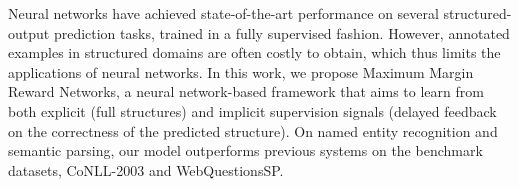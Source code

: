 Neural networks have achieved state-of-the-art performance on several structured-output prediction tasks, trained in a fully supervised fashion.  However, annotated examples in structured domains are often costly to obtain, which thus limits the applications of neural networks.  In this work, we propose Maximum Margin Reward Networks, a neural network-based framework that aims to learn from both explicit (full structures) and implicit supervision signals (delayed feedback on the correctness of the predicted structure).  On named entity recognition and semantic parsing, our model outperforms previous systems on the benchmark datasets, CoNLL-2003 and WebQuestionsSP.

